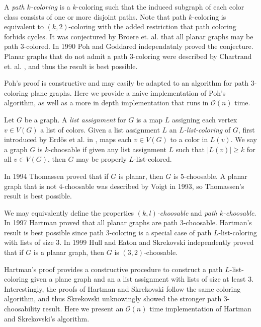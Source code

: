 \documentclass[letterpaper, 12pt]{article}
\theoremstyle{definition}
\theoremstyle{definition}
\theoremstyle{thm}
\theoremstyle{definition}
\begin{document}
A \textit{path $k$-coloring} is a
$k$-coloring such that the induced subgraph of each color class consists of one
or more disjoint paths. Note that path $k$-coloring is equivalent to
$(k,2)$-coloring with the added restriction that path coloring forbids cycles.
It was conjectured by Broere et. al. \cite{broere} that all planar graphs may
be path $3$-colored. In 1990 Poh \cite{poh} and Goddared \cite{goddard}
independatnly proved the conjecture. Planar graphs that do not admit a path $3$-coloring
were described by Chartrand et. al. \cite{kronk}, and thus the result is best possible.

Poh's proof is constructive and may easily be adapted to an algorithm for path
$3$-coloring plane graphs. Here we provide a naive implementation of Poh's
algorithm, as well as a more in depth implementation that runs in
$\mathcal{O}(n)$ time.

Let $G$ be a graph. A \textit{list assignment} for $G$ is a map $L$ assigning
each vertex $v\in V(G)$ a list of colors. Given a list assignment $L$ an
\textit{$L$-list-coloring} of $G$, first introduced
by Erd{\"o}s et al. in \cite{erdos}, maps each $v\in V(G)$ to a color in $L(v)$.
We say a graph $G$ is $k$-choosable if given any list assignment $L$ such that
$|L(v)|\ge k$ for all $v\in V(G)$, then $G$ may be properly $L$-list-colored.

In 1994 Thomassen \cite{thomassen} proved that if $G$ is planar, then $G$ is
$5$-choosable. A planar graph that is not $4$-choosable was
described by Voigt \cite{voigt} in 1993, so Thomassen's result is best possible.

We may equivalently define the properties \textit{$(k,l)$-choosable} and
\textit{path $k$-choosable}. In 1997 Hartman \cite{hartman} proved that all
planar graphs are path $3$-choosable. Hartman's result is best possible since
path $3$-coloring is a special case of path $L$-list-coloring with lists of size
$3$. In 1999 Hull and Eaton \cite{hull} and Skrekovski \cite{skrekovski}
independently proved that if $G$ is a planar graph, then $G$ is
$(3,2)$-choosable.

Hartman's proof provides a constructive procedure to construct a path
$L$-list-coloring given a plane graph and an a list assignment with lists
of size at least $3$. Interestingly, the proofs of Hartman and Skrekovski follow
the same coloring algorithm, and thus Skrekovski unknowingly showed the stronger
path $3$-choosability result. Here we present an $\mathcal{O}(n)$ time
implementation of Hartman and Skrekovski's algorithm.
\end{document}
